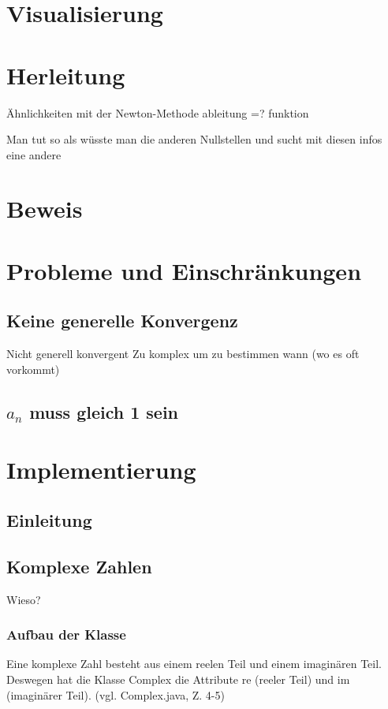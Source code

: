 \documentclass[12pt]{article}
\begin{document}
\section{Visualisierung}

\section{Herleitung}
Ähnlichkeiten mit der Newton-Methode
ableitung =? funktion

Man tut so als wüsste man die anderen Nullstellen und sucht mit diesen infos eine andere

\section{Beweis}

\section{Probleme und Einschränkungen}
\subsection{Keine generelle Konvergenz}
Nicht generell konvergent
Zu komplex um zu bestimmen wann (wo es oft vorkommt)

\subsection{$a_n$ muss gleich 1 sein}

\section{Implementierung}
\subsection{Einleitung}
\subsection{Komplexe Zahlen}
Wieso?

\subsubsection{Aufbau der Klasse}
Eine komplexe Zahl besteht aus einem reelen Teil und einem imaginären Teil. Deswegen hat die Klasse Complex die Attribute re (reeler Teil) und im (imaginärer Teil). 
(vgl. Complex.java, Z. 4-5)
\end{document}
